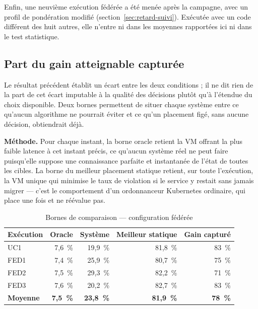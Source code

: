 Enfin, une neuvième exécution fédérée a été menée après la campagne, avec un profil de pondération modifié (section~\ref{sec:retard-suivi}). Exécutée avec un code différent des huit autres, elle n'entre ni dans les moyennes rapportées ici ni dans le test statistique.

\subsection{Part du gain atteignable capturée}
\label{sec:gain-capture}

Le résultat précédent établit un écart entre les deux conditions ; il ne dit rien de la part de cet écart imputable à la qualité des décisions plutôt qu'à l'étendue du choix disponible. Deux bornes permettent de situer chaque système entre ce qu'aucun algorithme ne pourrait éviter et ce qu'un placement figé, sans aucune décision, obtiendrait déjà.

\textbf{Méthode.} Pour chaque instant, la borne oracle retient la VM offrant la plus faible latence à cet instant précis, ce qu'aucun système réel ne peut faire puisqu'elle suppose une connaissance parfaite et instantanée de l'état de toutes les cibles. La borne du meilleur placement statique retient, sur toute l'exécution, la VM unique qui minimise le taux de violation si le service y restait sans jamais migrer — c'est le comportement d'un ordonnanceur Kubernetes ordinaire, qui place une fois et ne réévalue pas.

\begin{table}[H]
    \centering
    \caption{Bornes de comparaison — configuration fédérée}
    \label{tab:bornes-federe}
    \begin{tabular}{lrrrr}
        \toprule
        \textbf{Exécution} & \textbf{Oracle} & \textbf{Système} & \textbf{Meilleur statique} & \textbf{Gain capturé} \\
        \midrule
        UC1  &  7,6~\% & 19,9~\% & 81,8~\% & 83~\% \\
        FED1 &  7,4~\% & 25,9~\% & 80,7~\% & 75~\% \\
        FED2 &  7,5~\% & 29,3~\% & 82,2~\% & 71~\% \\
        FED3 &  7,6~\% & 20,2~\% & 82,7~\% & 83~\% \\
        \midrule
        \textbf{Moyenne} & \textbf{7,5~\%} & \textbf{23,8~\%} & \textbf{81,9~\%} & \textbf{78~\%} \\
        \bottomrule
    \end{tabular}
\end{table}

